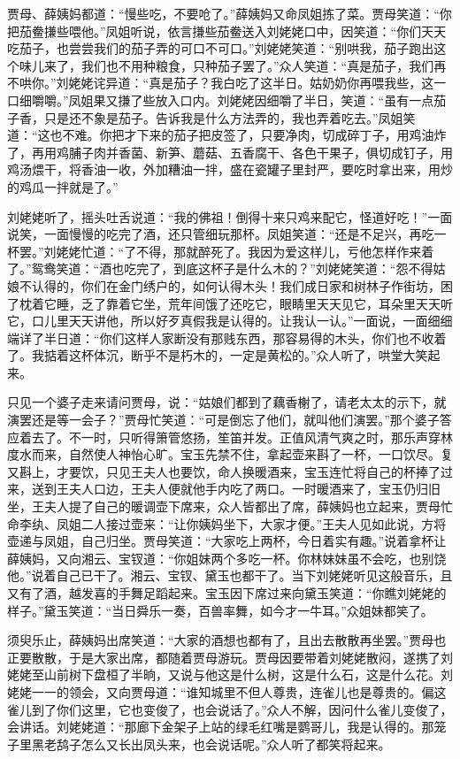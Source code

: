 \documentclass[12pt,oneside]{book}
\begin{document}
贾母、薛姨妈都道：“慢些吃，不要呛了。”薛姨妈又命凤姐拣了菜。贾母笑道：“你把茄鲞搛些喂他。”凤姐听说，依言搛些茄鲞送入刘姥姥口中，因笑道：“你们天天吃茄子，也尝尝我们的茄子弄的可口不可口。”刘姥姥笑道：“别哄我，茄子跑出这个味儿来了，我们也不用种粮食，只种茄子罢了。”众人笑道：“真是茄子，我们再不哄你。”刘姥姥诧异道：“真是茄子？我白吃了这半日。姑奶奶你再喂我些，这一口细嚼嚼。”凤姐果又搛了些放入口内。刘姥姥因细嚼了半日，笑道：“虽有一点茄子香，只是还不象是茄子。告诉我是什么方法弄的，我也弄着吃去。”凤姐笑道：“这也不难。你把才下来的茄子把皮签了，只要净肉，切成碎丁子，用鸡油炸了，再用鸡脯子肉并香菌、新笋、蘑菇、五香腐干、各色干果子，俱切成钉子，用鸡汤煨干，将香油一收，外加糟油一拌，盛在瓷罐子里封严，要吃时拿出来，用炒的鸡瓜一拌就是了。”

刘姥姥听了，摇头吐舌说道：“我的佛祖！倒得十来只鸡来配它，怪道好吃！”一面说笑，一面慢慢的吃完了酒，还只管细玩那杯。凤姐笑道：“还是不足兴，再吃一杯罢。”刘姥姥忙道：“了不得，那就醉死了。我因为爱这样儿，亏他怎样作来着了。”鸳鸯笑道：“酒也吃完了，到底这杯子是什么木的？”刘姥姥笑道：“怨不得姑娘不认得的，你们在金门绣户的，如何认得木头！我们成日家和树林子作街坊，困了枕着它睡，乏了靠着它坐，荒年间饿了还吃它，眼睛里天天见它，耳朵里天天听它，口儿里天天讲他，所以好歹真假我是认得的。让我认一认。”一面说，一面细细端详了半日道：“你们这样人家断没有那贱东西，那容易得的木头，你们也不收着了。我掂着这杯体沉，断乎不是朽木的，一定是黄松的。”众人听了，哄堂大笑起来。

只见一个婆子走来请问贾母，说：“姑娘们都到了藕香榭了，请老太太的示下，就演罢还是等一会子？”贾母忙笑道：“可是倒忘了他们，就叫他们演罢。”那个婆子答应着去了。不一时，只听得箫管悠扬，笙笛并发。正值风清气爽之时，那乐声穿林度水而来，自然使人神怡心旷。宝玉先禁不住，拿起壶来斟了一杯，一口饮尽。复又斟上，才要饮，只见王夫人也要饮，命人换暖酒来，宝玉连忙将自己的杯捧了过来，送到王夫人口边，王夫人便就他手内吃了两口。一时暖酒来了，宝玉仍归旧坐，王夫人提了自己的暖调壶下席来，众人皆都出了席，薛姨妈也立起来，贾母忙命李纨、凤姐二人接过壶来：“让你姨妈坐下，大家才便。”王夫人见如此说，方将壶递与凤姐，自己归坐。贾母笑道：“大家吃上两杯，今日着实有趣。”说着拿杯让薛姨妈，又向湘云、宝钗道：“你姐妹两个多吃一杯。你林妹妹虽不会吃，也别饶他。”说着自己已干了。湘云、宝钗、黛玉也都干了。当下刘姥姥听见这般音乐，且又有了酒，越发喜的手舞足蹈起来。宝玉因下席过来向黛玉笑道：“你瞧刘姥姥的样子。”黛玉笑道：“当日舜乐一奏，百兽率舞，如今才一牛耳。”众姐妹都笑了。

须臾乐止，薛姨妈出席笑道：“大家的酒想也都有了，且出去散散再坐罢。”贾母也正要散散，于是大家出席，都随着贾母游玩。贾母因要带着刘姥姥散闷，遂携了刘姥姥至山前树下盘桓了半晌，又说与他这是什么树，这是什么石，这是什么花。刘姥姥一一的领会，又向贾母道：“谁知城里不但人尊贵，连雀儿也是尊贵的。偏这雀儿到了你们这里，它也变俊了，也会说话了。”众人不解，因问什么雀儿变俊了，会讲话。刘姥姥道：“那廊下金架子上站的绿毛红嘴是鹦哥儿，我是认得的。那笼子里黑老鸹子怎么又长出凤头来，也会说话呢。”众人听了都笑将起来。
\end{document}
